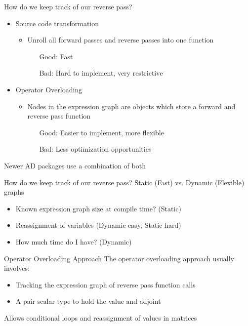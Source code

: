 \documentclass[dvipsnames]{beamer}
\begin{document}
\begin{frame}{How do we keep track of our reverse pass?}
\begin{itemize}
  \item Source code transformation
    \begin{itemize}
        \item Unroll all forward passes and reverse passes into one function
        \begin{itemize}
            \item[Good:] Fast
            \item[Bad:] Hard to implement, very restrictive
        \end{itemize}
    \end{itemize}

    \item Operator Overloading
    \begin{itemize}
        \item Nodes in the expression graph are objects which store a forward and reverse pass function
        \begin{itemize}
          \item[Good:] Easier to implement, more flexible
          \item[Bad:] Less optimization opportunities
        \end{itemize}
    \end{itemize}
\end{itemize}
Newer AD packages use a combination of both
\end{frame}
\begin{frame}{How do we keep track of our reverse pass?}
Static (Fast) vs. Dynamic (Flexible) graphs
\begin{itemize}
\item Known expression graph size at compile time? (Static)
\item Reassignment of variables (Dynamic easy, Static hard)
\item How much time do I have? (Dynamic)
\end{itemize}
\end{frame}

\begin{frame}{Operator Overloading Approach}
The operator overloading approach usually involves:
\begin{itemize}
    \item Tracking the expression graph of reverse pass function calls
    \item A pair scalar type to hold the value and adjoint
\end{itemize}
Allows conditional loops and reassignment of values in matrices\\
\end{frame}
\end{document}
